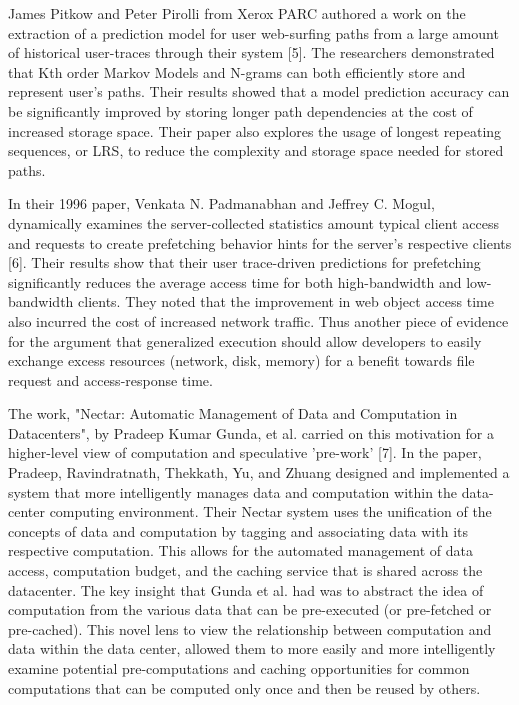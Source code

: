 James Pitkow and Peter Pirolli from Xerox PARC authored a work  on the extraction of a prediction model for user web-surfing paths from a large amount of historical user-traces through their system [5]. The researchers demonstrated that Kth order Markov Models and N-grams can both efficiently store and represent user's paths. Their results showed that a model prediction accuracy can be significantly improved by storing longer path dependencies at the cost of increased storage space. Their paper also explores the usage of longest repeating sequences, or LRS, to reduce the complexity and storage space needed for stored paths.

In their 1996 paper, Venkata N. Padmanabhan and Jeffrey C. Mogul, dynamically examines the server-collected statistics amount typical client access and requests to create prefetching behavior hints for the server's respective clients [6]. Their results show that their user trace-driven predictions for prefetching significantly reduces the average access time for both high-bandwidth and low-bandwidth clients. They noted that the improvement in web object access time also incurred the cost of increased network traffic. Thus another piece of evidence for the argument that generalized execution should allow developers to easily exchange excess resources (network, disk, memory) for a benefit towards file request and access-response time.

The work, "Nectar: Automatic Management of Data and Computation in Datacenters", by Pradeep Kumar Gunda, et al. carried on this motivation for a higher-level view of computation and speculative 'pre-work' [7]. In the paper, Pradeep, Ravindratnath, Thekkath, Yu, and Zhuang designed and implemented a system that more intelligently manages data and computation within the data-center computing environment. Their Nectar system uses the unification of the concepts of data and computation by tagging and associating data with its respective computation. This allows for the automated management of data access, computation budget, and the caching service that is shared across the datacenter.  The key insight that Gunda et al. had was to abstract the idea of computation from the various data that can be pre-executed (or pre-fetched or pre-cached). This novel lens to view the relationship between computation and data within the data center, allowed them to more easily and more intelligently examine potential pre-computations and caching opportunities for common computations that can be computed only once and then be reused by others.

